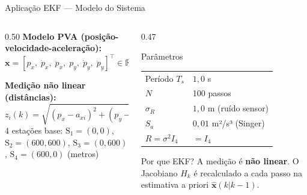 \documentclass[aspectratio=169]{beamer}
\begin{document}
\begin{frame}{Aplicação EKF --- Modelo do Sistema}
    \begin{columns}[T]
        \begin{column}{0.50\textwidth}
            \textbf{Modelo PVA (posição-velocidade-aceleração):}
            \[
                \mathbf{x} = [p_x,\;\dot{p}_x,\;\ddot{p}_x,\;
                               p_y,\;\dot{p}_y,\;\ddot{p}_y]^\top \in \mathbb{R}^6
            \]

            \textbf{Medição não linear (distâncias):}
            \[
                z_i(k) = \sqrt{(p_x - a_{xi})^2 + (p_y - a_{yi})^2} + v_i
            \]
            $4$ estações base: $\text{S}_1{=}(0,0)$, $\text{S}_2{=}(600,600)$,
            $\text{S}_3{=}(0,600)$, $\text{S}_4{=}(600,0)$ (metros)
        \end{column}
        \begin{column}{0.47\textwidth}
            \begin{block}{Parâmetros}
                \begin{tabular}{ll}
                    Período $T_s$ & $1{,}0$ s \\
                    $N$ & 100 passos \\
                    $\sigma_R$ & $1{,}0$ m (ruído sensor) \\
                    $S_a$ & $0{,}01$ m²/s³ (Singer) \\
                    $R = \sigma^2 I_4$ & $= I_4$ \\
                \end{tabular}
            \end{block}
            \vspace{0.2cm}
            \begin{alertblock}{Por que EKF?}
                A medição é \textbf{não linear}. O Jacobiano $H_k$
                é recalculado a cada passo na estimativa a priori
                $\hat{\mathbf{x}}(k|k{-}1)$.
            \end{alertblock}
        \end{column}
    \end{columns}
\end{frame}
\end{document}
